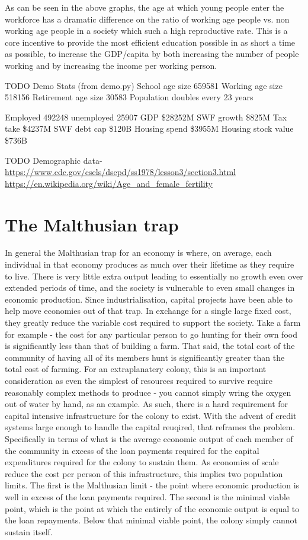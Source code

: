 \documentclass[10pt]{article}
\begin{document}
As can be seen in the above graphs, the age at which young people enter the workforce has a dramatic difference on the ratio of working age people vs. non working age people in a society which such a high reproductive rate. This is a core incentive to provide the most efficient education possible in as short a time as possible, to increase the GDP/capita by both increasing the number of people working and by increasing the income per working person.


TODO Demo Stats (from demo.py)
School age size 659581
Working age size 518156
Retirement age size 30583
Population doubles every 23 years

Employed 492248 unemployed 25907
GDP \$28252M
SWF growth \$825M
Tax take \$4237M
SWF debt cap \$120B
Housing spend \$3955M
Housing stock value \$736B

TODO Demographic data-
\url{https://www.cdc.gov/csels/dsepd/ss1978/lesson3/section3.html}
\url{https://en.wikipedia.org/wiki/Age_and_female_fertility}




\section{The Malthusian trap}
In general the Malthusian trap for an economy is where, on average, each individual in that economy produces as much over their lifetime as they require to live. There is very little extra output leading to essentially no growth even over extended periods of time, and the society is vulnerable to even small changes in economic production. Since industrialisation, capital projects have been able to help move economies out of that trap. In exchange for a single large fixed cost, they greatly reduce the variable cost required to support the society. Take a farm for example - the cost for any particular person to go hunting for their own food is significantly less than that of building a farm. That said, the total cost of the community of having all of its members hunt is significantly greater than the total cost of farming. For an extraplanatery colony, this is an important consideration as even the simplest of resources required to survive require reasonably complex methods to produce - you cannot simply wring the oxygen out of water by hand, as an example. As such, there is a hard requirement for capital intensive infrastructure for the colony to exist. With the advent of credit systems large enough to handle the capital reuqired, that reframes the problem. Specifically in terms of what is the average economic output of each member of the community in excess of the loan payments required for the capital expenditures required for the colony to sustain them. As economies of scale reduce the cost per person of this infrastructure, this implies two population limits. The first is the Malthusian limit - the point where economic production is well in excess of the loan payments required. The second is the minimal viable point, which is the point at which the entirely of the economic output is equal to the loan repayments. Below that minimal viable point, the colony simply cannot sustain itself.
\end{document}

